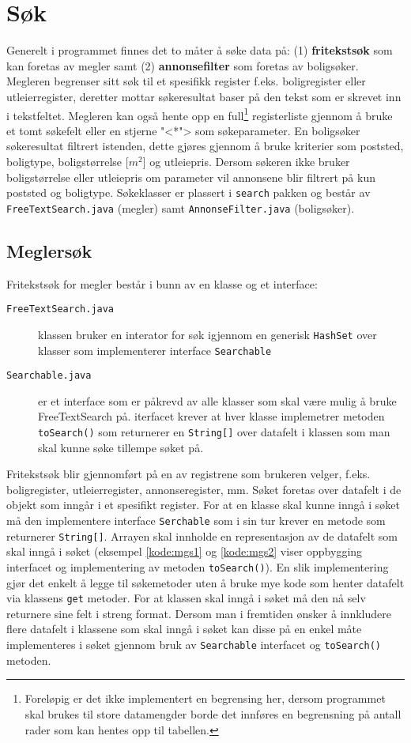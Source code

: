 \section{Søk} \label{sec:sok}
Generelt i programmet finnes det to måter å søke data på: (1) \textbf{fritekstsøk} som kan foretas av megler samt (2) \textbf{annonsefilter} som foretas av boligsøker. Megleren begrenser sitt søk til et spesifikk register f.eks. boligregister eller utleierregister, deretter mottar søkeresultat baser på den tekst som er skrevet inn i tekstfeltet. Megleren kan også hente opp en full\footnote{Foreløpig er det ikke implementert en begrensing her, dersom programmet skal brukes til store datamengder borde det innføres en begrensning på antall rader som kan hentes opp til tabellen.} registerliste gjennom å bruke et tomt søkefelt eller en stjerne "<*"> som søkeparameter. 
En boligsøker søkeresultat filtrert istenden, dette gjøres gjennom å bruke kriterier som poststed, boligtype, boligstørrelse [$m^2$] og utleiepris. Dersom søkeren ikke bruker boligstørrelse eller utleiepris om parameter vil annonsene blir filtrert på kun poststed og boligtype.
Søkeklasser er plassert i \texttt{search} pakken og består av \texttt{FreeTextSearch.java} (megler) samt \texttt{AnnonseFilter.java} (boligsøker).

\subsection{Meglersøk} \label{subsec:sok:megler}
Fritekstsøk for megler består i bunn av en klasse og et interface:
\begin{description}
\item[\texttt{FreeTextSearch.java}] klassen bruker en interator for søk igjennom en generisk \texttt{HashSet} over klasser som implementerer interface \texttt{Searchable}
\item[\texttt{Searchable.java}] er et interface som er påkrevd av alle klasser som skal være mulig å bruke FreeTextSearch på. iterfacet krever at hver klasse implemetrer metoden \texttt{toSearch()} som returnerer en \texttt{String[]} over datafelt i klassen som man skal kunne søke tillempe søket på.
\end{description}

Fritekstsøk blir gjennomført på en av registrene som brukeren velger, f.eks. boligregister, utleierregister, annonseregister, mm. Søket foretas over datafelt i de objekt som inngår i et spesifikt register. For at en klasse skal kunne inngå i søket må den implementere interface \texttt{Serchable} som i sin tur krever en metode som returnerer \texttt{String[]}. Arrayen skal innholde en  representasjon av de datafelt som skal inngå i søket (eksempel \ref{kode:mgs1} og \ref{kode:mgs2} viser oppbygging interfacet og implementering av metoden \texttt{toSearch()}). 
En slik implementering gjør det enkelt å legge til søkemetoder uten å bruke mye kode som henter datafelt via klassens \texttt{get} metoder. For at klassen skal inngå i søket må den nå selv returnere sine felt i streng format.
Dersom man i fremtiden ønsker å innkludere flere datafelt i klassene som skal inngå i søket kan disse på en enkel måte implementeres i søket gjennom bruk av \texttt{Searchable} interfacet og \texttt{toSearch()} metoden.

